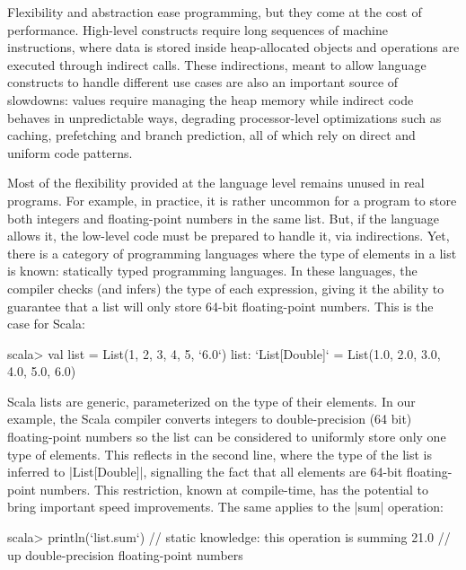 Flexibility and abstraction ease programming, but they come at the cost of performance. High-level constructs require long sequences of machine instructions, where data is stored inside heap-allocated objects and operations are executed through indirect calls. These indirections, meant to allow language constructs to handle different use cases are also an important source of slowdowns: values require managing the heap memory while indirect code behaves in unpredictable ways, degrading processor-level optimizations such as caching, prefetching and branch prediction, all of which rely on direct and uniform code patterns. %

Most of the flexibility provided at the language level remains unused in real programs. For example, in practice, it is rather uncommon for a program to store both integers and floating-point numbers in the same list. But, if the language allows it, the low-level code must be prepared to handle it, via indirections. Yet, there is a category of programming languages where the type of elements in a list is known: statically typed programming languages. In these languages, the compiler checks (and infers) the type of each expression, giving it the ability to guarantee that a list will only store 64-bit floating-point numbers. This is the case for Scala:

\begin{lstlisting-nobreak}
 scala> val list = List(1, 2, 3, 4, 5, `6.0`)
 list: `List[Double]` = List(1.0, 2.0, 3.0, 4.0, 5.0, 6.0)
\end{lstlisting-nobreak}

Scala lists are generic, parameterized on the type of their elements. In our example, the Scala compiler converts integers to double-precision (64 bit) floating-point numbers so the list can be considered to uniformly store only one type of elements. This reflects in the second line, where the type of the list is inferred to |List[Double]|, signalling the fact that all elements are 64-bit floating-point numbers. This restriction, known at compile-time, has the potential to bring important speed improvements. The same applies to the |sum| operation:

\begin{lstlisting-nobreak}
 scala> println(`list.sum`) // static knowledge: this operation is summing
 21.0                             // up double-precision floating-point numbers
\end{lstlisting-nobreak}

